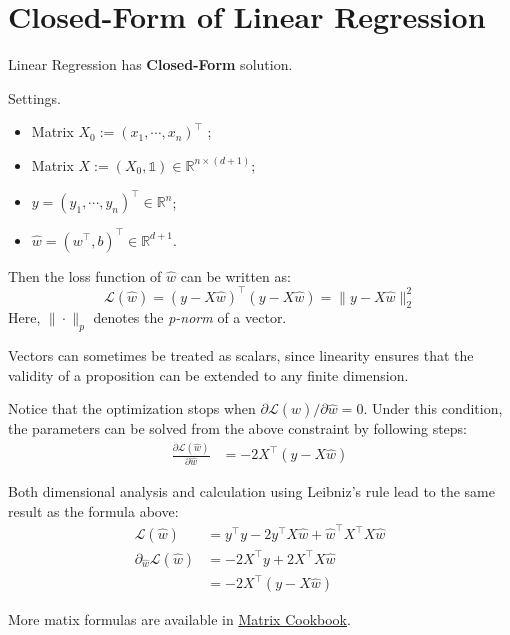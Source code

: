 \documentclass[../main]{subfiles}
\begin{document}
\section{Closed-Form of Linear Regression}
\begin{proposition}
  Linear Regression has \textbf{Closed-Form} solution.
\end{proposition}
Settings.
\begin{itemize}
  \item Matrix $X_0:=(x_1,\cdots,x_n)^\top$ ; 
  \item Matrix $X:=(X_0,\mathbb 1)\in \mathbb R^{n\times(d+1)}$;
  \item $y=(y_1,\cdots,y_n)^\top\in\mathbb R^n$;
  \item $\hat w=(w^\top,b)^\top\in\mathbb R^{d+1}$.
\end{itemize}
Then the loss function of $\hat w$ can be written as:
\begin{equation}
    \mathcal L(\hat w)=(y-X\hat w)^\top (y-X\hat w)=\|y-X\hat w\|_2^2
\end{equation}
Here, $\|\cdot\|_p$ denotes the \emph{p-norm} of a vector.
\begin{note}
  Vectors can sometimes be treated as scalars, since linearity ensures that the validity of a proposition can be extended to any finite dimension.  
\end{note}
Notice that the optimization stops when $\partial\mathcal L(\hat w)/\partial \hat w=0$. Under this condition, the parameters can be solved from the above constraint by following steps:
\begin{align}
  \frac{\partial\mathcal L(\hat w)}{\partial\hat w}&=-2X^\top(y-X\hat w)
\end{align}
\begin{note}
  Both dimensional analysis and calculation using Leibniz's rule lead to the same result as the formula above:
  \begin{align*}
      \mathcal L(\hat w)&=y^\top y-2y^\top X\hat w+\hat w^\top X^\top X\hat w\\
      \partial_{\hat w}\mathcal L(\hat w)&=-2X^\top y+2X^\top X\hat w\\
      &=-2 X^\top(y-X\hat w)
  \end{align*}
\end{note}
\begin{remark}
  More matix formulas are available in \href{https://www.math.uwaterloo.ca/~hwolkowi/matrixcookbook.pdf}{Matrix Cookbook}.
\end{remark}
\end{document}
